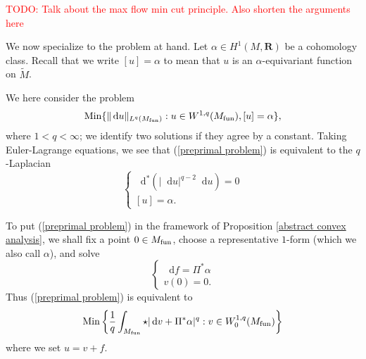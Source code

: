 \documentclass[reqno,11pt]{amsart}
\newcommand{\RR}{\mathbf{R}}
\newcommand*\dif{\mathop{}\!\mathrm{d}}
\newcommand{\Min}{\mathrm{Min}}
\theoremstyle{definition}
\numberwithin{equation}{section}
\newcommand\todo[1]{\textcolor{red}{TODO: #1}}
\begin{document}
\todo{Talk about the max flow min cut principle. Also shorten the arguments here}

We now specialize to the problem at hand.
Let $\alpha \in H^1(M, \RR)$ be a cohomology class.
Recall that we write $[u] = \alpha$ to mean that $u$ is an $\alpha$-equivariant function on $\tilde M$.

We here consider the problem
\begin{equation}\label{preprimal problem}
	\Min\{\|\dif u\|_{L^q(M_{\rm fun})}: u \in W^{1, q}(M_{\rm fun}), [u] = \alpha\},
\end{equation}
where $1 < q < \infty$; we identify two solutions if they agree by a constant.
Taking Euler-Lagrange equations, we see that (\ref{preprimal problem}) is equivalent to the $q$-Laplacian 
\begin{equation}\label{qLaplace}
\begin{cases}
	\dif^*(|\dif u|^{q - 2} \dif u) = 0 \\
	[u] = \alpha.
\end{cases}
\end{equation}

To put (\ref{preprimal problem}) in the framework of Proposition \ref{abstract convex analysis}, we shall fix a point $0 \in M_{\rm fun}$, choose a representative $1$-form (which we also call $\alpha$), and solve 
$$\begin{cases}
\dif f = \Pi^* \alpha \\
v(0) = 0.
\end{cases}$$
Thus (\ref{preprimal problem}) is equivalent to
\begin{equation}\label{primal problem}
	\Min\left\{\frac{1}{q} \int_{M_{\rm fun}} \star|\dif v + \Pi^* \alpha|^q: v \in W^{1, q}_0(M_{\rm fun})\right\}
\end{equation}
where we set $u = v + f$.
\end{document}
